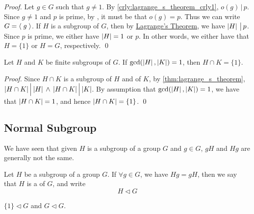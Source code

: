 \begin{proof}
  Let $g \in G$ such that $g \neq 1$. By \cref{crly:lagrange_s_theorem_crly1}, $o(g) \, | \, p$. Since $g \neq 1$ and $p$ is prime, by , it must be that $o(g) = p$. Thus we can write $G = \langle \; g \; \rangle$. If $H$ is a subgroup of $G$, then by \hyperref[thm:lagrange_s_theorem]{Lagrange's Theorem}, we have $\left|H\right| \, \big| \, p$. Since $p$ is prime, we either have $\left|H\right| = 1$ or $p$. In other words, we either have that $H = \{1\}$ or $H = G$, respectively. \qed
\end{proof}

\begin{crly}
\label{crly:lagrange_s_theorem_crly3}
  Let $H$ and $K$ be finite subgroups of $G$. If $\gcd(\left|H\right|, \left|K\right|) = 1$, then $H \cap K = \{1\}$.
\end{crly}

\begin{proof}
  Since $H \cap K$ is a subgroup of $H$ and of $K$, by \autoref{thm:lagrange_s_theorem}, $\left|H \cap K\right| \Big| \left|H\right| \, \land \, \left|H \cap K\right| \Big| \left|K\right|$. By assumption that $\gcd(\left|H\right|, \left|K\right|) = 1$, we have that $\left|H \cap K\right| = 1$, and hence $\left|H \cap K\right| = \{ 1 \}$. \qed
\end{proof}


\subsection{Normal Subgroup}%
\label{sub:normal_subgroup}

We have seen that given $H$ is a subgroup of a group $G$ and $g \in G$, $gH$ and $Hg$ are generally not the same.

\begin{defn}
\label{defn:normal_subgroup}
  Let $H$ be a subgroup of a group $G$. If $\forall g \in G$, we have $Hg = gH$, then we say that $H$ is a  of $G$, and write
  \begin{equation*}
    H \triangleleft G
  \end{equation*}
\end{defn}

\begin{eg}
  $\{1\} \triangleleft G$ and $G \triangleleft G$.
\end{eg}

